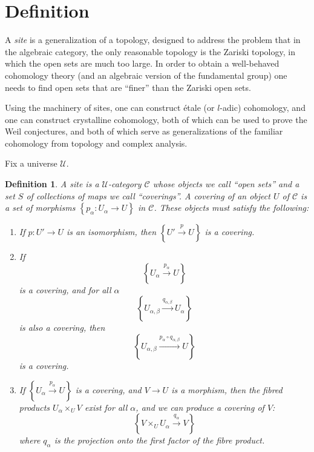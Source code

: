 \documentclass{article}
\newcommand{\curlies}[1]{\left\{{#1}\right\}}
\newtheorem{defn}{Definition}
\begin{document}
\section*{Definition}

A \emph{site} is a generalization of a topology, designed to address the problem that in the algebraic category, the only reasonable topology is the Zariski topology, in which the open sets are much too large.  In order to obtain a well-behaved cohomology theory (and an algebraic version of the fundamental group) one needs to find open sets that are ``finer'' than the Zariski open sets.  

Using the machinery of sites, one can construct \'etale (or $l$-adic) cohomology, and one can construct crystalline cohomology, both of which can be used to prove the Weil conjectures, and both of which serve as generalizations of the familiar cohomology from topology and complex analysis. 

Fix a universe $\mathcal{U}$.

\begin{defn}
A \emph{site} is a $\mathcal{U}$-category $\mathcal{C}$ whose objects we call
``open sets'' and a set $S$ of collections of maps we call
``coverings''.  A covering of an object $U$ of $\mathcal{C}$ is a  set of morphisms
$\curlies{p_\alpha : U_\alpha \to U}$ in $\mathcal{C}$.  These objects
must satisfy the following:
\begin{enumerate}
\item If $p:U'\to U$ is an isomorphism, then $\curlies{U' \overset{p}{\to} U}$ is a covering.
\item If
\[
\curlies{U_\alpha \overset{p_\alpha}{\to} U}
\]
is a covering, and for all $\alpha$
\[
\curlies{U_{\alpha,\beta} \overset{q_{\alpha,\beta}}{\to} U_\alpha}
\]
is also a covering, then 
\[
\curlies{U_{\alpha,\beta} \overset{p_\alpha \circ
q_{\alpha,\beta}}{\longrightarrow} U}
\]
is a covering.
\item If $\curlies{U_\alpha \overset{p_\alpha}{\to} U}$ is a covering,
and $V\to U$ is a morphism, then the fibred products $U_\alpha \times_U V$ exist for all $\alpha$, and we can produce a covering of
$V$:
\[
\curlies{V\times_U U_\alpha \overset{q_\alpha}{\to} V}
\]
where $q_\alpha$ is the projection onto the first factor of the fibre
product.
\end{enumerate}
\end{defn}
\end{document}

